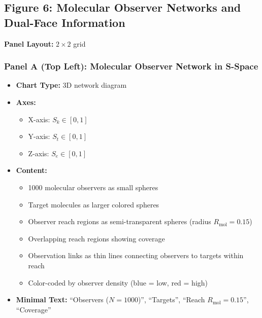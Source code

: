 
\subsection*{Figure 6: Molecular Observer Networks and Dual-Face Information}

\textbf{Panel Layout:} $2 \times 2$ grid

\subsubsection*{Panel A (Top Left): Molecular Observer Network in S-Space}
\begin{itemize}
\item \textbf{Chart Type:} 3D network diagram
\item \textbf{Axes:}
  \begin{itemize}
  \item X-axis: $S_k \in [0,1]$
  \item Y-axis: $S_t \in [0,1]$
  \item Z-axis: $S_e \in [0,1]$
  \end{itemize}
\item \textbf{Content:}
  \begin{itemize}
  \item 1000 molecular observers as small spheres
  \item Target molecules as larger colored spheres
  \item Observer reach regions as semi-transparent spheres (radius $R_{\text{mol}} = 0.15$)
  \item Overlapping reach regions showing coverage
  \item Observation links as thin lines connecting observers to targets within reach
  \item Color-coded by observer density (blue = low, red = high)
  \end{itemize}
\item \textbf{Minimal Text:} ``Observers ($N=1000$)'', ``Targets'', ``Reach $R_{\text{mol}}=0.15$'', ``Coverage''
\end{itemize}

